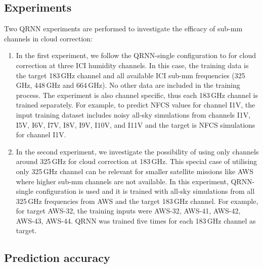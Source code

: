 \documentclass[amt]{copernicus}
\begin{document}
\subsection{Experiments}
%
Two QRNN experiments are performed to investigate the efficacy of sub-mm channels in cloud correction: 
\begin{enumerate}
	\item In the first experiment, we follow the QRNN-single configuration to for cloud correction at three ICI humidity channels. In this case, the training data is the target 183\,GHz channel and all available ICI sub-mm frequencies (325\,GHz, 448\,GHz and 664\,GHz). No other data are included in the training process. The experiment is also channel specific, thus each 183\,GHz channel is trained separately. For example, to predict NFCS values for channel I1V, the input training dataset includes noisy all-sky simulations from channels I1V, I5V, I6V, I7V, I8V, I9V, I10V, and I11V and the target is NFCS simulations for channel I1V.
	
	\item In the second experiment, we investigate the possibility of using only channels around 325\,GHz for cloud correction at 183\,GHz. This special case of utilising only 325\,GHz channel can be relevant for smaller satellite missions like AWS where higher sub-mm channels are not available. In this experiment, QRNN-single configuration is used and it is trained with all-sky simulations from all 325\,GHz frequencies from AWS and the target 183\,GHz channel. For example, for target AWS-32, the training inputs were AWS-32, AWS-41, AWS-42, AWS-43, AWS-44. QRNN was trained five times for each 183\,GHz channel as target. 	
\end{enumerate}	

\subsection{Prediction accuracy}
\end{document}
